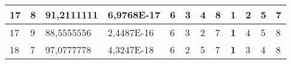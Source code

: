 \documentclass[conference]{IEEEtran}
\begin{document}
\begin{table*}[]
\begin{tabular}{|llll|llllllll|}
\multicolumn{1}{|l|}{17}                                                    & \multicolumn{1}{l|}{8}                                                        & \multicolumn{1}{l|}{91,2111111}                                                   & 6,9768E-17                     & \multicolumn{1}{l|}{6}                                                  & \multicolumn{1}{l|}{3}                                                  & \multicolumn{1}{l|}{4}                                                  & \multicolumn{1}{l|}{8}                                                  & \multicolumn{1}{l|}{\textbf{1}}                                         & \multicolumn{1}{l|}{2}                                                  & \multicolumn{1}{l|}{5}                                                  & 7                          \\ \hline
\multicolumn{1}{|l|}{17}                                                    & \multicolumn{1}{l|}{9}                                                        & \multicolumn{1}{l|}{88,5555556}                                                   & 2,4487E-16                     & \multicolumn{1}{l|}{6}                                                  & \multicolumn{1}{l|}{3}                                                  & \multicolumn{1}{l|}{2}                                                  & \multicolumn{1}{l|}{7}                                                  & \multicolumn{1}{l|}{\textbf{1}}                                         & \multicolumn{1}{l|}{4}                                                  & \multicolumn{1}{l|}{5}                                                  & 8                          \\ \hline
\multicolumn{1}{|l|}{18}                                                    & \multicolumn{1}{l|}{7}                                                        & \multicolumn{1}{l|}{97,0777778}                                                   & 4,3247E-18                     & \multicolumn{1}{l|}{6}                                                  & \multicolumn{1}{l|}{2}                                                  & \multicolumn{1}{l|}{5}                                                  & \multicolumn{1}{l|}{7}                                                  & \multicolumn{1}{l|}{\textbf{1}}                                         & \multicolumn{1}{l|}{3}                                                  & \multicolumn{1}{l|}{4}                                                  & 8                          \\ \hline

\end{tabular}
\end{table*}
\end{document}
